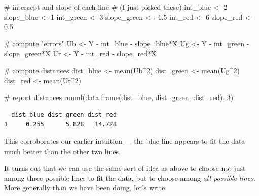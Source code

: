 \documentclass[
  letterpaper,
  DIV=11,
  numbers=noendperiod]{scrreprt}
\newenvironment{Shaded}{\begin{snugshade}}{\end{snugshade}}
\newcommand{\CommentTok}[1]{\textcolor[rgb]{0.37,0.37,0.37}{#1}}
\newcommand{\DecValTok}[1]{\textcolor[rgb]{0.68,0.00,0.00}{#1}}
\newcommand{\FloatTok}[1]{\textcolor[rgb]{0.68,0.00,0.00}{#1}}
\newcommand{\FunctionTok}[1]{\textcolor[rgb]{0.28,0.35,0.67}{#1}}
\newcommand{\NormalTok}[1]{\textcolor[rgb]{0.00,0.23,0.31}{#1}}
\newcommand{\OtherTok}[1]{\textcolor[rgb]{0.00,0.23,0.31}{#1}}
\newcommand{\SpecialCharTok}[1]{\textcolor[rgb]{0.37,0.37,0.37}{#1}}
\begin{document}
\begin{Shaded}
\begin{Highlighting}[]
\CommentTok{\# intercept and slope of each line}
\CommentTok{\# (I just picked these)}
\NormalTok{int\_blue }\OtherTok{\textless{}{-}} \DecValTok{2}
\NormalTok{slope\_blue }\OtherTok{\textless{}{-}} \DecValTok{1}
\NormalTok{int\_green }\OtherTok{\textless{}{-}} \DecValTok{3}
\NormalTok{slope\_green }\OtherTok{\textless{}{-}} \SpecialCharTok{{-}}\FloatTok{1.5}
\NormalTok{int\_red }\OtherTok{\textless{}{-}} \DecValTok{6}
\NormalTok{slope\_red }\OtherTok{\textless{}{-}} \FloatTok{0.5}

\CommentTok{\# compute "errors"}
\NormalTok{Ub }\OtherTok{\textless{}{-}}\NormalTok{ Y }\SpecialCharTok{{-}}\NormalTok{ int\_blue }\SpecialCharTok{{-}}\NormalTok{ slope\_blue}\SpecialCharTok{*}\NormalTok{X}
\NormalTok{Ug }\OtherTok{\textless{}{-}}\NormalTok{ Y }\SpecialCharTok{{-}}\NormalTok{ int\_green }\SpecialCharTok{{-}}\NormalTok{ slope\_green}\SpecialCharTok{*}\NormalTok{X}
\NormalTok{Ur }\OtherTok{\textless{}{-}}\NormalTok{ Y }\SpecialCharTok{{-}}\NormalTok{ int\_red }\SpecialCharTok{{-}}\NormalTok{ slope\_red}\SpecialCharTok{*}\NormalTok{X}

\CommentTok{\# compute distances}
\NormalTok{dist\_blue }\OtherTok{\textless{}{-}} \FunctionTok{mean}\NormalTok{(Ub}\SpecialCharTok{\^{}}\DecValTok{2}\NormalTok{)}
\NormalTok{dist\_green }\OtherTok{\textless{}{-}} \FunctionTok{mean}\NormalTok{(Ug}\SpecialCharTok{\^{}}\DecValTok{2}\NormalTok{)}
\NormalTok{dist\_red }\OtherTok{\textless{}{-}} \FunctionTok{mean}\NormalTok{(Ur}\SpecialCharTok{\^{}}\DecValTok{2}\NormalTok{)}

\CommentTok{\# report distances}
\FunctionTok{round}\NormalTok{(}\FunctionTok{data.frame}\NormalTok{(dist\_blue, dist\_green, dist\_red), }\DecValTok{3}\NormalTok{)}
\end{Highlighting}
\end{Shaded}

\begin{verbatim}
  dist_blue dist_green dist_red
1     0.255      5.828   14.728
\end{verbatim}

This corroborates our earlier intuition --- the blue line appears to fit
the data much better than the other two lines.

It turns out that we can use the same sort of idea as above to choose
not just among three possible lines to fit the data, but to choose among
\emph{all possible lines}. More generally than we have been doing, let's
write
\end{document}
